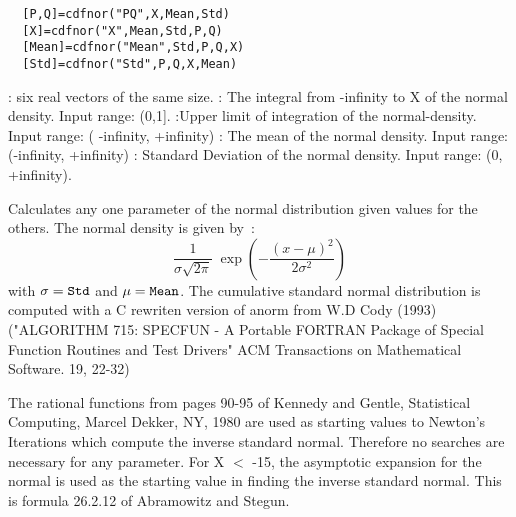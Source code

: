 \begin{mandesc}
\end{mandesc}
\label{cdfnor}
\begin{calling_sequence}
\begin{verbatim}
  [P,Q]=cdfnor("PQ",X,Mean,Std)  
  [X]=cdfnor("X",Mean,Std,P,Q)  
  [Mean]=cdfnor("Mean",Std,P,Q,X)  
  [Std]=cdfnor("Std",P,Q,X,Mean)  
\end{verbatim}
\end{calling_sequence}
\begin{parameters}
  \begin{varlist}
     : six real vectors of the same size.
     : The integral from -infinity to X of the normal density. Input range: (0,1].
       :Upper limit of integration of the normal-density. Input range: ( -infinity, +infinity)
       :  The mean of the normal density. Input range: (-infinity, +infinity)
       :  Standard Deviation of the normal density. Input range: (0, +infinity).
  \end{varlist}
\end{parameters}
\begin{mandescription}
  Calculates any one parameter of the normal distribution given values for the others.
  The normal density is given by~:
  \begin{equation}
    \frac{1}{\sigma\sqrt{2\pi}} \; \exp\left(-\frac{\left(x-\mu\right)^2}{2\sigma^2} \right)
  \end{equation} 
  with $\sigma = \mbox{\tt Std}$ and $\mu = \mbox{\tt Mean}$.
  The  cumulative standard normal distribution is computed with a C rewriten version of 
  anorm from W.D Cody (1993) ("ALGORITHM 715: SPECFUN - A Portable FORTRAN
  Package of Special Function Routines and Test Drivers" ACM Transactions on Mathematical Software. 19, 22-32) 

  The rational functions from pages  90-95  of Kennedy and Gentle,
  Statistical  Computing,  Marcel  Dekker, NY,  1980 are  used  as
  starting values to Newton's Iterations which compute the inverse
  standard normal.  Therefore no  searches  are necessary for  any
  parameter. 
  For X $<$ -15, the asymptotic expansion for the normal is used  as
  the starting value in finding the inverse standard normal.
  This is formula 26.2.12 of Abramowitz and Stegun.
\end{mandescription}

